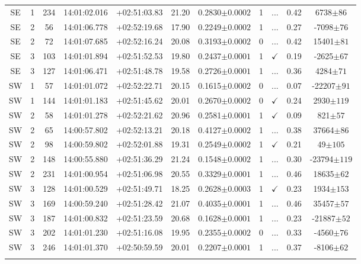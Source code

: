 \begin{landscape}
\begin{longtable}{ccccccccccc}
	SE & 1 & 234 & 14:01:02.016 & +02:51:03.83 & 21.20 & 0.2830$\pm{0.0002}$ & 1 & ... & 0.42 & 6738$\pm{86}$ \\
	SE & 2 & 56 & 14:01:06.778 & +02:52:19.68 & 17.90 & 0.2249$\pm{0.0002}$ & 1 & ... & 0.27 & -7098$\pm{76}$ \\
	SE & 2 & 72 & 14:01:07.685 & +02:52:16.24 & 20.08 & 0.3193$\pm{0.0002}$ & 0 & ... & 0.42 & 15401$\pm{81}$ \\
	SE & 3 & 103 & 14:01:01.894 & +02:51:52.53 & 19.80 & 0.2437$\pm{0.0001}$ & 1 & $\checkmark$ & 0.19 & -2625$\pm{67}$ \\
	SE & 3 & 127 & 14:01:06.471 & +02:51:48.78 & 19.58 & 0.2726$\pm{0.0001}$ & 1 & ... & 0.36 & 4284$\pm{71}$ \\
	SW & 1 & 57 & 14:01:01.072 & +02:52:22.71 & 20.15 & 0.1615$\pm{0.0002}$ & 0 & ... & 0.07 & -22207$\pm{91}$ \\
	SW & 1 & 144 & 14:01:01.183 & +02:51:45.62 & 20.01 & 0.2670$\pm{0.0002}$ & 0 & $\checkmark$ & 0.24 & 2930$\pm{119}$ \\
	SW & 2 & 58 & 14:01:01.278 & +02:52:21.62 & 20.96 & 0.2581$\pm{0.0001}$ & 1 & $\checkmark$ & 0.09 & 821$\pm{57}$ \\
	SW & 2 & 65 & 14:00:57.802 & +02:52:13.21 & 20.18 & 0.4127$\pm{0.0002}$ & 1 & ... & 0.38 & 37664$\pm{86}$ \\
	SW & 2 & 98 & 14:00:59.802 & +02:52:01.88 & 19.31 & 0.2549$\pm{0.0002}$ & 1 & $\checkmark$ & 0.21 & 49$\pm{105}$ \\
	SW & 2 & 148 & 14:00:55.880 & +02:51:36.29 & 21.24 & 0.1548$\pm{0.0002}$ & 1 & ... & 0.30 & -23794$\pm{119}$ \\
	SW & 2 & 231 & 14:01:00.954 & +02:51:06.98 & 20.55 & 0.3329$\pm{0.0001}$ & 1 & ... & 0.46 & 18635$\pm{62}$ \\
	SW & 3 & 128 & 14:01:00.529 & +02:51:49.71 & 18.25 & 0.2628$\pm{0.0003}$ & 1 & $\checkmark$ & 0.23 & 1934$\pm{153}$ \\
	SW & 3 & 169 & 14:00:59.240 & +02:51:28.42 & 21.07 & 0.4035$\pm{0.0001}$ & 1 & ... & 0.46 & 35457$\pm{57}$ \\
	SW & 3 & 187 & 14:01:00.832 & +02:51:23.59 & 20.68 & 0.1628$\pm{0.0001}$ & 1 & ... & 0.23 & -21887$\pm{52}$ \\
	SW & 3 & 202 & 14:01:01.230 & +02:51:16.08 & 19.95 & 0.2355$\pm{0.0002}$ & 0 & ... & 0.33 & -4560$\pm{76}$ \\
	SW & 3 & 246 & 14:01:01.370 & +02:50:59.59 & 20.01 & 0.2207$\pm{0.0001}$ & 1 & ... & 0.37 & -8106$\pm{62}$ \\
			\hline
	\label{2tbl:MSJ140102.0+025242.6}
	\end{longtable}
\end{landscape}


